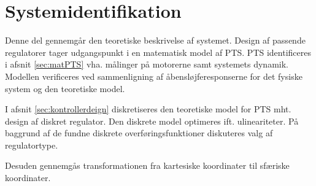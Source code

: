 \part{Systemidentifikation}
Denne del gennemgår den teoretiske beskrivelse af systemet.
Design af passende regulatorer tager udgangspunkt i en matematisk model af PTS.
PTS identificeres i afsnit \ref{sec:matPTS} vha. målinger på motorerne samt systemets dynamik. 
Modellen verificeres ved sammenligning af åbensløjferesponserne for det fysiske system og den teoretiske model.

I afsnit \ref{sec:kontrollerdeign} diskretiseres den teoretiske model for PTS mht. design af diskret regulator.
Den diskrete model optimeres ift. ulineariteter.
På baggrund af de fundne diskrete overføringsfunktioner diskuteres valg af regulatortype. 

Desuden gennemgås transformationen fra kartesiske koordinater til sfæriske koordinater.
%
%


